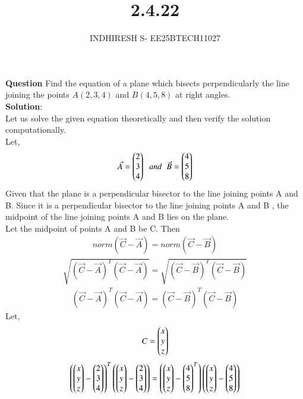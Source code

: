 \documentclass[journal]{IEEEtran}
\theoremstyle{remark}
\begin{document}

\onecolumn

\title{2.4.22}
\author{INDHIRESH S- EE25BTECH11027}
\maketitle


\renewcommand{\thefigure}{\theenumi}
\renewcommand{\thetable}{\theenumi}

\textbf{Question}  Find the equation of a plane which bisects perpendicularly the line joining the points $A(2, 3, 4)$ and $B(4, 5, 8)$ at right angles.\\
\textbf{Solution}:\\
Let us solve the given equation theoretically and then verify the solution computationally. \\
Let,
\begin{align}
    \Vec{A}=\begin{pmatrix}2\\3\\4\end{pmatrix}\;\;and\;\;\Vec{B}=\begin{pmatrix}4\\5\\8\end{pmatrix}
\end{align}
Given that the plane is a perpendicular bisector to the line joining points A and B. Since it is a perpendicular bisector to the line joining points A and B , the midpoint of the line joining points A and B lies on the plane.\\
Let the midpoint of points A and B be C. Then
\begin{align}
norm({\Vec{C}-\Vec{A}})=norm({\Vec{C}-\Vec{B}})
\end{align}
\begin{align}
    \sqrt{(\Vec{C}-\Vec{A})^T(\Vec{C}-\Vec{A})}=\sqrt{(\Vec{C}-\Vec{B})^T(\Vec{C}-\Vec{B})}
\end{align}
\begin{align}
    (\Vec{C}-\Vec{A})^T(\Vec{C}-\Vec{A})=(\Vec{C}-\Vec{B})^T(\Vec{C}-\Vec{B})
\end{align}
Let,
\begin{align}
    C=\begin{pmatrix}x \\ y \\ z\end{pmatrix}
\end{align}
\begin{align}
    \left(\begin{pmatrix}x \\ y \\ z\end{pmatrix}-\begin{pmatrix}2\\3\\4\end{pmatrix}\right)^T\left(\begin{pmatrix}x \\ y \\ z\end{pmatrix}-\begin{pmatrix}2\\3\\4\end{pmatrix}\right)=\left(\begin{pmatrix}x \\ y \\ z\end{pmatrix}-\begin{pmatrix}4\\5\\8\end{pmatrix}^T\right)\left(\begin{pmatrix}x \\ y \\ z\end{pmatrix}-\begin{pmatrix}4\\5\\8\end{pmatrix}\right)
\end{align}
\end{document}
